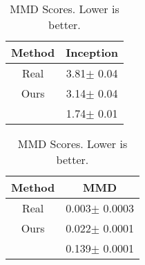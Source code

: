 \begin{table}
\parbox{.45\linewidth}{
\centering
\captionsetup{justification=centering}
\caption{Inception Scores. Higher is better.}
    \begin{tabular}{|c|c|}
         \hline 
         Method & Inception\\ \hline
         Real & 3.81$\pm$ 0.04 \\ \hline
         Ours & 3.14$\pm$ 0.04\\ \hline
        ~\cite{Vondrick16} & 1.74$\pm$ 0.01\\ \hline
    \end{tabular}
    \label{Inception}
}
\hfill
\parbox{.45\linewidth}{
\centering
\captionsetup{justification=centering}
\caption{MMD Scores. Lower is better.}
    \begin{tabular}{|c|c|}
         \hline 
         Method & MMD\\ \hline 
         Real & 0.003$\pm$ 0.0003\\ \hline
        Ours & 0.022$\pm$ 0.0001\\ \hline
        ~\cite{Vondrick16} & 0.139$\pm$ 0.0001 \\ \hline
     \end{tabular}
     \label{MMD}
}
\end{table}
 
 

